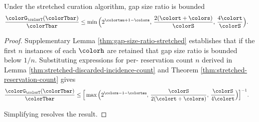 \begin{theorem}
\label{thm:stretched-gap-size}
Under the stretched curation algorithm, gap size ratio is bounded
\begin{align*}
\frac{\colorG_{\colorT}(\colorTbar)}{\colorTbar}
&\leq
\min\Big(
  2^{\colortau+1-\colors},\,
  \frac{2(\colort + \colors)}{\colorS},\,
  \frac{4\colort}{\colorS}
\Big).
\end{align*}
\end{theorem}
\begin{proof}

Supplementary Lemma \ref{thm:gap-size-ratio-stretched} establishes that if the first $n$ instances of each \hv{} $\colorh$ are retained that gap size ratio is bounded below $1/n$.
Substituting expressions for per-\hv{} reservation count $n$ derived in Lemma \ref{thm:stretched-discarded-incidence-count} and Theorem \ref{thm:stretched-reservation-count} gives
\begin{align*}
  \frac{\colorG_{\colorT}(\colorTbar)}{\colorTbar}
  &\leq
  \Big[
    \max\Big(
      2^{\colors - 1 - \colortau},\,
      \frac{\colorS}{2(\colort + \colors)},\,
      \frac{\colorS}{4\colort}
    \Big)
  \Big]^{-1}.
\end{align*}

Simplifying resolves the result.

\end{proof}
